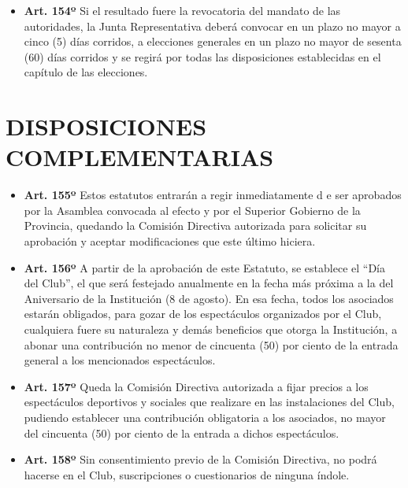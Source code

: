 \documentclass[]{book}
\providecommand{\tightlist}{%
  \setlength{\itemsep}{0pt}\setlength{\parskip}{0pt}}
\begin{document}
\begin{itemize}
\tightlist
\item
  \textbf{Art. 154º} Si el resultado fuere la revocatoria del mandato de
  las autoridades, la Junta Representativa deberá convocar en un plazo
  no mayor a cinco (5) días corridos, a elecciones generales en un plazo
  no mayor de sesenta (60) días corridos y se regirá por todas las
  disposiciones establecidas en el capítulo de las elecciones.
\end{itemize}

\chapter{DISPOSICIONES COMPLEMENTARIAS}\label{cap26}

\begin{itemize}
\tightlist
\item
  \textbf{Art. 155º} Estos estatutos entrarán a regir inmediatamente d e
  ser aprobados por la Asamblea convocada al efecto y por el Superior
  Gobierno de la Provincia, quedando la Comisión Directiva autorizada
  para solicitar su aprobación y aceptar modificaciones que este último
  hiciera.
\end{itemize}

\begin{itemize}
\tightlist
\item
  \textbf{Art. 156º} A partir de la aprobación de este Estatuto, se
  establece el ``Día del Club'', el que será festejado anualmente en la
  fecha más próxima a la del Aniversario de la Institución (8 de
  agosto). En esa fecha, todos los asociados estarán obligados, para
  gozar de los espectáculos organizados por el Club, cualquiera fuere su
  naturaleza y demás beneficios que otorga la Institución, a abonar una
  contribución no menor de cincuenta (50) por ciento de la entrada
  general a los mencionados espectáculos.
\end{itemize}

\begin{itemize}
\tightlist
\item
  \textbf{Art. 157º} Queda la Comisión Directiva autorizada a fijar
  precios a los espectáculos deportivos y sociales que realizare en las
  instalaciones del Club, pudiendo establecer una contribución
  obligatoria a los asociados, no mayor del cincuenta (50) por ciento de
  la entrada a dichos espectáculos.
\end{itemize}

\begin{itemize}
\tightlist
\item
  \textbf{Art. 158º} Sin consentimiento previo de la Comisión Directiva,
  no podrá hacerse en el Club, suscripciones o cuestionarios de ninguna
  índole.
\end{itemize}
\end{document}

